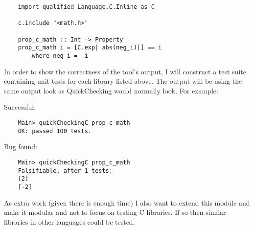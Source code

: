 \begin{verbatim}
    import qualified Language.C.Inline as C
    
    c.include "<math.h>"
    
    prop_c_math :: Int -> Property
    prop_c_math i = [C.exp| abs(neg_i)|] == i
        where neg_i = -i
\end{verbatim}

In order to show the correctness of the tool's output, I will construct a test suite containing unit tests for each library listed above.
The output will be using the same output look as QuickChecking would normally look.
For example:

Successful:

\begin{verbatim}
    Main> quickCheckingC prop_c_math
    OK: passed 100 tests.
\end{verbatim}

Bug found:

\begin{verbatim}
    Main> quickCheckingC prop_c_math
    Falsifiable, after 1 tests:
    [2]
    [-2]
\end{verbatim}

As extra work (given there is enough time) I also want to extend this module and make it modular and not to focus on testing C libraries.
If so then similar libraries in other languages could be tested.

